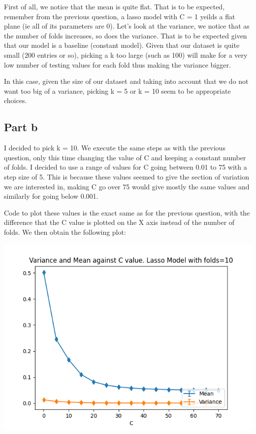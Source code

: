 \documentclass[10pt]{article}
\begin{document}
First of all, we notice that the mean is quite flat. That is to be expected, remember from the previous question,
a lasso model with C = 1 yeilds a flat plane (ie all of its parameters are 0).
Let's look at the variance, we notice that as the number of folds increases, so does the variance.
That is to be expected given that our model is a baseline (constant model). Given that our dataset is quite small
(200 entries or so), picking a k too large (such as 100) will make for a very low number of testing values for each 
fold thus making the variance bigger.

In this case, given the size of our dataset and taking into account that we do not want too big of a variance,
picking k = 5 or k = 10 seem to be appropriate choices.

\subsection*{Part b}
I decided to pick k = 10. We execute the same steps as with the previous question, only this 
time changing the value of C and keeping a constant number of folds.
I decided to use a range of values for C going between 0.01 to 75 with a step size of 5.
This is because these values seemed to give the section of variation we are interested in,
making C go over 75 would give mostly the same values and similarly for going below 0.001.

Code to plot these values is the exact same as for the previous question,
with the difference that the C value is plotted on the X axis instead of the number of 
folds. We then obtain the following plot:

\begin{center}
    \includegraphics[scale=0.4]{Figure_10.png}
\end{center}
\end{document}
